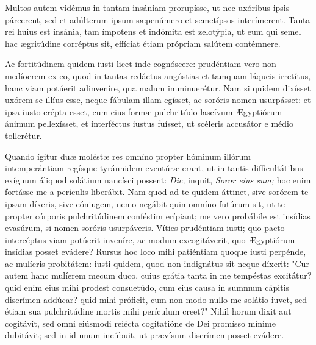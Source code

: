 {{\noindent Multos autem vidémus in tantam insániam prorupísse, ut nec uxóribus ipsis párcerent, sed et adúlterum ipsum sæpenúmero et semetípsos interímerent. Tanta rei huius est insánia, tam ímpotens et indómita est zelotýpia, ut eum qui semel hac ægritúdine corréptus sit, effíciat étiam própriam salútem contémnere.

\noindent Ac fortitúdinem quidem iusti licet inde cognóscere: prudéntiam vero non medíocrem ex eo, quod in tantas redáctus angústias et tamquam láqueis irretítus, hanc viam potúerit adinveníre, qua malum imminuerétur. Nam si quidem dixísset uxórem se illíus esse, neque fábulam illam egísset, ac soróris nomen usurpásset: et ipsa iusto erépta esset, cum eius formæ pulchritúdo lascívum Ægyptiórum ánimum pellexísset, et interféctus iustus fuísset, ut scéleris accusátor e médio tollerétur.

\noindent Quando ígitur duæ moléstæ res omníno propter hóminum illórum intemperántiam regísque tyránnidem eventúræ erant, ut in tantis difficultátibus exíguum áliquod solátium nancísci possent: \emph{Dic,} inquit, \emph{Soror eius sum;} hoc enim fortásse me a perículis liberábit. Nam quod ad te quidem áttinet, sive sorórem te ipsam díxeris, sive cóniugem, nemo negábit quin omníno futúrum sit, ut te propter córporis pulchritúdinem conféstim erípiant; me vero probábile est insídias evasúrum, si nomen soróris usurpáveris. Víties prudéntiam iusti; quo pacto intercéptus viam potúerit inveníre, ac modum excogitáverit, quo Ægyptiórum insídias posset evádere? Rursus hoc loco mihi patiéntiam quoque iusti perpénde, ac mulíeris probitátem: iusti quidem, quod non indignátus sit neque díxerit: "Cur autem hanc mulíerem mecum duco, cuius grátia tanta in me tempéstas excitátur? quid enim eius mihi prodest consuetúdo, cum eius causa in summum cápitis discrímen addúcar? quid mihi próficit, cum non modo nullo me solátio iuvet, sed étiam sua pulchritúdine mortis mihi perículum creet?" Nihil horum dixit aut cogitávit, sed omni eiúsmodi reiécta cogitatióne de Dei promísso mínime dubitávit; sed in id unum incúbuit, ut prævísum discrímen posset evádere.}}
\newcommand{\responsoriumii}{\pars{Responsorium 2.} \scriptura{\textbf{H141}}

\vspace{-5mm}

\responsorium{I}{temporalia/resp-dumstaretabrahamadradicem-CROCHU.gtex}{}}

